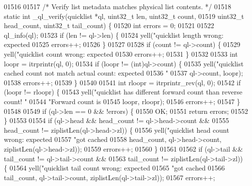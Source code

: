 \begin{DoxyCode}
{{{{{{{{{{{{{{{{{{01516 
01517 \textcolor{comment}{/* Verify list metadata matches physical list contents. */}
01518 \textcolor{keyword}{static} \textcolor{keywordtype}{int} \_ql\_verify(quicklist *ql, uint32\_t len, uint32\_t count,
01519                       uint32\_t head\_count, uint32\_t tail\_count) \{
01520     \textcolor{keywordtype}{int} errors = 0;
01521 
01522     ql\_info(ql);
01523     \textcolor{keywordflow}{if} (len != ql->len) \{
01524         yell(\textcolor{stringliteral}{"quicklist length wrong: expected %
01525         errors++;
01526     \}
01527 
01528     \textcolor{keywordflow}{if} (count != ql->count) \{
01529         yell(\textcolor{stringliteral}{"quicklist count wrong: expected %
01530         errors++;
01531     \}
01532 
01533     \textcolor{keywordtype}{int} loopr = itrprintr(ql, 0);
01534     \textcolor{keywordflow}{if} (loopr != (\textcolor{keywordtype}{int})ql->count) \{
01535         yell(\textcolor{stringliteral}{"quicklist cached count not match actual count: expected %
01536              \textcolor{stringliteral}{"%
01537              ql->count, loopr);
01538         errors++;
01539     \}
01540 
01541     \textcolor{keywordtype}{int} rloopr = itrprintr\_rev(ql, 0);
01542     \textcolor{keywordflow}{if} (loopr != rloopr) \{
01543         yell(\textcolor{stringliteral}{"quicklist has different forward count than reverse count!  "}
01544              \textcolor{stringliteral}{"Forward count is %
01545              loopr, rloopr);
01546         errors++;
01547     \}
01548 
01549     \textcolor{keywordflow}{if} (ql->len == 0 && !errors) \{
01550         OK;
01551         \textcolor{keywordflow}{return} errors;
01552     \}
01553 
01554     \textcolor{keywordflow}{if} (ql->head && head\_count != ql->head->count &&
01555         head\_count != ziplistLen(ql->head->zl)) \{
01556         yell(\textcolor{stringliteral}{"quicklist head count wrong: expected %
01557              \textcolor{stringliteral}{"got cached %
01558              head\_count, ql->head->count, ziplistLen(ql->head->zl));
01559         errors++;
01560     \}
01561 
01562     \textcolor{keywordflow}{if} (ql->tail && tail\_count != ql->tail->count &&
01563         tail\_count != ziplistLen(ql->tail->zl)) \{
01564         yell(\textcolor{stringliteral}{"quicklist tail count wrong: expected %
01565              \textcolor{stringliteral}{"got cached %
01566              tail\_count, ql->tail->count, ziplistLen(ql->tail->zl));
01567         errors++;
}}}}}}}}}}}}}}}}}}}}}}}}}}}
\end{DoxyCode}
